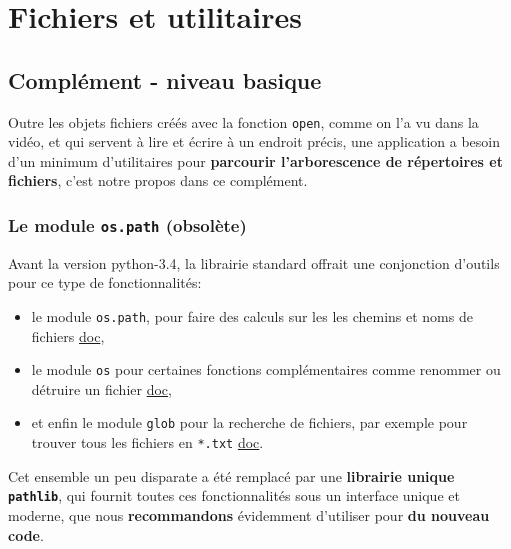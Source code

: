     \hypertarget{fichiers-et-utilitaires}{%
\section{Fichiers et utilitaires}\label{fichiers-et-utilitaires}}

    \hypertarget{compluxe9ment---niveau-basique}{%
\subsection{Complément - niveau
basique}\label{compluxe9ment---niveau-basique}}

    Outre les objets fichiers créés avec la fonction \texttt{open}, comme on
l'a vu dans la vidéo, et qui servent à lire et écrire à un endroit
précis, une application a besoin d'un minimum d'utilitaires pour
\textbf{parcourir l'arborescence de répertoires et fichiers}, c'est
notre propos dans ce complément.

    \hypertarget{le-module-os.path-obsoluxe8te}{%
\subsubsection{\texorpdfstring{Le module \texttt{os.path}
(obsolète)}{Le module os.path (obsolète)}}\label{le-module-os.path-obsoluxe8te}}

    Avant la version python-3.4, la librairie standard offrait une
conjonction d'outils pour ce type de fonctionnalités:

\begin{itemize}
\tightlist
\item
  le module \texttt{os.path}, pour faire des calculs sur les les chemins
  et noms de fichiers
  \href{https://docs.python.org/3/library/os.html}{doc},
\item
  le module \texttt{os} pour certaines fonctions complémentaires comme
  renommer ou détruire un fichier
  \href{https://docs.python.org/3/library/os.path.html}{doc},
\item
  et enfin le module \texttt{glob} pour la recherche de fichiers, par
  exemple pour trouver tous les fichiers en \texttt{*.txt}
  \href{https://docs.python.org/3/library/glob.html}{doc}.
\end{itemize}

    Cet ensemble un peu disparate a été remplacé par une \textbf{librairie
unique \texttt{pathlib}}, qui fournit toutes ces fonctionnalités sous un
interface unique et moderne, que nous \textbf{recommandons} évidemment
d'utiliser pour \textbf{du nouveau code}.\\

